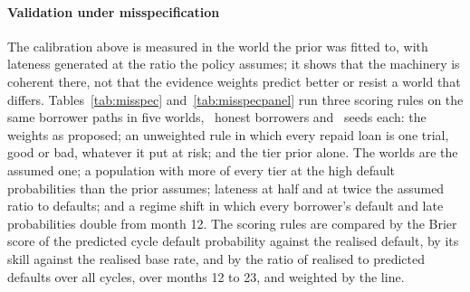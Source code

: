 \documentclass[preprint,11pt,authoryear]{elsarticle}
\begin{document}
\paragraph{Validation under misspecification} The calibration above is measured in the world the
prior was fitted to, with lateness generated at the ratio the policy assumes; it shows that the
machinery is coherent there, not that the evidence weights predict better or resist a world that
differs. Tables~\ref{tab:misspec} and~\ref{tab:misspecpanel} run three scoring rules on the same
borrower paths in five worlds, \MisspecHonest\ honest borrowers and \MisspecSeeds\ seeds each: the
weights as proposed; an unweighted rule in which every repaid loan is one trial, good or bad,
whatever it put at risk; and the tier prior alone. The worlds are the assumed one; a population with
more of every tier at the high default probabilities than the prior assumes; lateness at half and at
twice the assumed ratio to defaults; and a regime shift in which every borrower's default and late
probabilities double from month 12. The scoring rules are compared by the Brier score of the
predicted cycle default probability against the realised default, by its skill against the realised
base rate, and by the ratio of realised to predicted defaults over all cycles, over months 12 to 23,
and weighted by the line.
\end{document}

